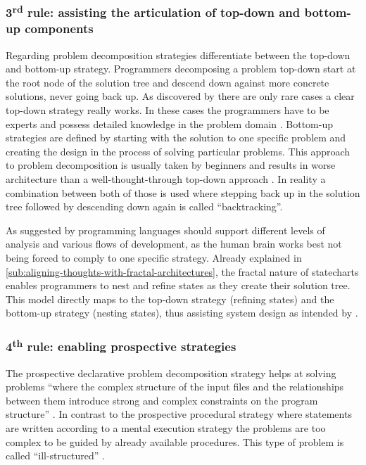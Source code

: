 \subsubsection{3\textsuperscript{rd} rule: assisting the articulation of top-down and bottom-up components}
Regarding problem decomposition strategies \textcite{visser_expert_1990} differentiate between the top-down and bottom-up strategy.
Programmers decomposing a problem top-down start at the root node of the solution tree and descend down against more concrete solutions, never going back up.
As discovered by \textcite{brooks_towards_1977} there are only rare cases a clear top-down strategy really works.
In these cases the programmers have to be experts and possess detailed knowledge in the problem domain \autocite{dutke_mentale_1994}.
Bottom-up strategies are defined by starting with the solution to one specific problem and creating the design in the process of solving particular problems.
This approach to problem decomposition is usually taken by beginners and results in worse architecture than a well-thought-through top-down approach \autocite{visser_expert_1990}.
In reality a combination between both of those is used where stepping back up in the solution tree followed by descending down again is called ``backtracking''.

As suggested by \textcite{visser_expert_1990} programming languages should support different levels of analysis and various flows of development, as the human brain works best not being forced to comply to one specific strategy.
Already explained in \cref{sub:aligning-thoughts-with-fractal-architectures}, the fractal nature of statecharts enables programmers to nest and refine states as they create their solution tree.
This model directly maps to the top-down strategy (refining states) and the bottom-up strategy (nesting states), thus assisting system design as intended by \textcite{visser_expert_1990}.

\subsubsection{4\textsuperscript{th} rule: enabling prospective strategies}
The prospective declarative problem decomposition strategy helps at solving problems ``where the complex structure of the input files and the relationships between them introduce strong and complex constraints on the program structure'' \autocite[243]{visser_expert_1990}.
In contrast to the prospective procedural strategy where statements are written according to a mental execution strategy the problems are too complex to be guided by already available procedures.
This type of problem is called ``ill-structured'' \autocite[236]{visser_expert_1990}.

